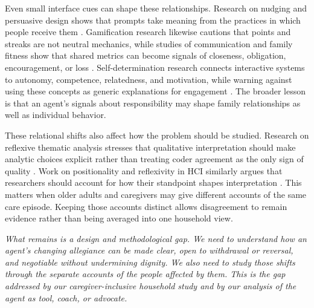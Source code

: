 Even small interface cues can shape these relationships. Research on nudging and persuasive design shows that prompts take meaning from the practices in which people receive them \cite{18,31}. Gamification research likewise cautions that points and streaks are not neutral mechanics, while studies of communication and family fitness show that shared metrics can become signals of closeness, obligation, encouragement, or loss \cite{19,40,46,68,91,97}. Self-determination research connects interactive systems to autonomy, competence, relatedness, and motivation, while warning against using these concepts as generic explanations for engagement \cite{14,95,113,116}. The broader lesson is that an agent's signals about responsibility may shape family relationships as well as individual behavior.

These relational shifts also affect how the problem should be studied. Research on reflexive thematic analysis stresses that qualitative interpretation should make analytic choices explicit rather than treating coder agreement as the only sign of quality \cite{15,16,93}. Work on positionality and reflexivity in HCI similarly argues that researchers should account for how their standpoint shapes interpretation \cite{75,103}. This matters when older adults and caregivers may give different accounts of the same care episode. Keeping those accounts distinct allows disagreement to remain evidence rather than being averaged into one household view.

\textit{What remains is a design and methodological gap. We need to understand how an agent's changing allegiance can be made clear, open to withdrawal or reversal, and negotiable without undermining dignity. We also need to study those shifts through the separate accounts of the people affected by them. This is the gap addressed by our caregiver-inclusive household study and by our analysis of the agent as tool, coach, or advocate.}
